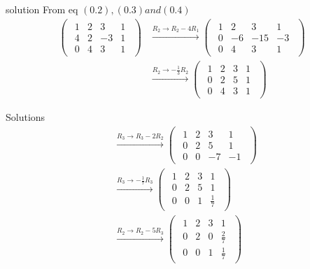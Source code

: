 \documentclass{beamer}
\begin{document}
\begin{frame}{solution}
From eq $(0.2),(0.3) and (0.4)$
\begin{align}
\begin{pmatrix}
\begin{array}{ccc|c}
1 & 2 & 3 & 1\\
4 & 2 & -3 & 1\\
0 & 4 & 3 & 1
\end{array}
\end{pmatrix}
&\xrightarrow{R_2 \to R_2 - 4R_1}
\begin{pmatrix}
\begin{array}{ccc|c}
1 & 2 & 3 & 1\\
0 & -6 & -15 & -3\\
0 & 4 & 3 & 1
\end{array}
\end{pmatrix} \\[4pt]
&\xrightarrow{R_2 \to -\tfrac{1}{3}R_2}
\begin{pmatrix}
\begin{array}{ccc|c}
1 & 2 & 3 & 1\\
0 & 2 & 5 & 1\\
0 & 4 & 3 & 1
\end{array}
\end{pmatrix} 
\end{align}
\end{frame}
\begin{frame}{Solutions}
    \begin{align}
&\xrightarrow{R_3 \to R_3 - 2R_2}
\begin{pmatrix}
\begin{array}{ccc|c}
1 & 2 & 3 & 1\\
0 & 2 & 5 & 1\\
0 & 0 & -7 & -1
\end{array}
\end{pmatrix} \\[4pt]
&\xrightarrow{R_3 \to -\tfrac{1}{7}R_3}
\begin{pmatrix}
\begin{array}{ccc|c}
1 & 2 & 3 & 1\\
0 & 2 & 5 & 1\\
0 & 0 & 1 & \tfrac{1}{7}
\end{array}
\end{pmatrix} \\[4pt]
&\xrightarrow{R_2 \to R_2 - 5R_3}
\begin{pmatrix}
\begin{array}{ccc|c}
1 & 2 & 3 & 1\\
0 & 2 & 0 & \tfrac{2}{7}\\
0 & 0 & 1 & \tfrac{1}{7}
\end{array}
\end{pmatrix} 
\end{align}
\end{frame}
\end{document}
